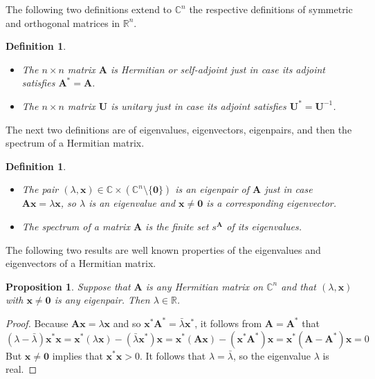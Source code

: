 \documentclass[11pt]{article}
\newcommand \R { \mathbb{R} }
\newcommand \C { \mathbb{C} }
\newtheorem{proposition}[theorem]{Proposition}
\newtheorem{definition}[theorem]{Definition}
\begin{document}
The following two definitions extend to $ \C^n $ the respective definitions 
of symmetric and orthogonal matrices in $ \R^n $.
\begin{definition}
\begin{itemize}
	\item The $n \times n$ matrix $ \mathbf A$ is \emph{Hermitian} or \emph{self-adjoint}
	just in case its adjoint satisfies $ \mathbf A^* = \mathbf A$.
	\item The $n \times n$ matrix $ \mathbf U$ is \emph{unitary} 
	just in case its adjoint satisfies $ \mathbf U^* = \mathbf U^{-1} $.		
\end{itemize}
\end{definition}

The next two definitions are of eigenvalues, eigenvectors, eigenpairs, 
and then the spectrum of a Hermitian matrix.

\begin{definition}
\begin{itemize}
	\item The pair $( \lambda, \mathbf x) \in \C \times( \C^n \setminus \{ \mathbf 0\} )$ 
	is an \emph{eigenpair} of $ \mathbf A$ just in case $ \mathbf {Ax} = \lambda \mathbf x$,
	so $ \lambda $ is an \emph{eigenvalue} 
	and $ \mathbf x \ne \mathbf 0$ is a corresponding \emph{eigenvector}.  	
	\item The \emph{spectrum} of a matrix $ \mathbf A$ is the finite set $ s^{ \mathbf A} $ 
	of its eigenvalues.
\end{itemize}
\end{definition}

The following two results are well known properties 
of the eigenvalues and eigenvectors of a Hermitian matrix.

\begin{proposition}
	Suppose that $ \mathbf A$ is any Hermitian matrix on $ \C^n $
	and that $( \lambda, \mathbf x) $ with $ \mathbf x \ne \mathbf 0$ is any eigenpair.
	Then $ \lambda \in \R$.
\end{proposition}

\begin{proof}
	Because $ \mathbf {Ax} = \lambda \mathbf x$ 
	and so $ \mathbf x^* \mathbf A^* = \bar \lambda \mathbf x^* $, 
	it follows from $ \mathbf A = \mathbf A^* $ that
 \[ ( \lambda - \bar \lambda ) \mathbf x^* \mathbf x
 = \mathbf x^* ( \lambda \mathbf x) - ( \bar \lambda \mathbf x^* ) \mathbf x
 = \mathbf x^* ( \mathbf {Ax} ) - ( \mathbf x^* \mathbf A^* ) \mathbf x 
 = \mathbf x^* ( \mathbf A - \mathbf A^* ) \mathbf x = 0 \]
	But $ \mathbf x \ne \mathbf 0$ implies that $ \mathbf x^* \mathbf x > 0$.
	It follows that $ \lambda = \bar \lambda $, so the eigenvalue $ \lambda $ is real.
\end{proof}
\end{document}
